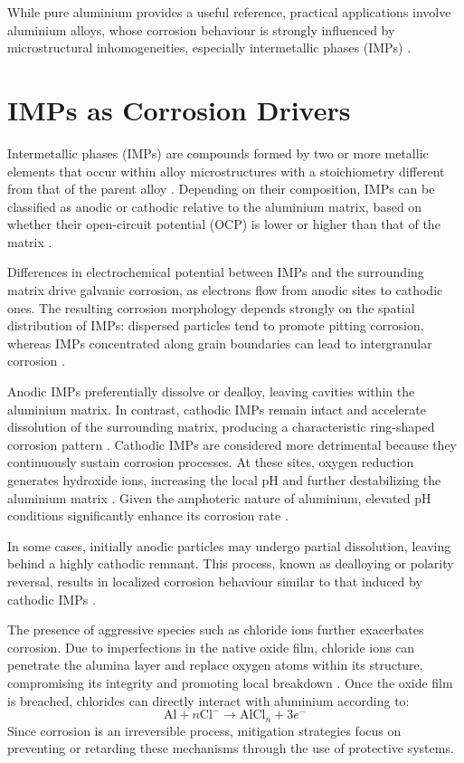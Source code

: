 \documentclass[11pt,twoside,a4paper]{report}
\begin{document}
While pure aluminium provides a useful reference, practical applications involve aluminium alloys, whose corrosion behaviour is strongly influenced by microstructural inhomogeneities, especially intermetallic phases (IMPs) \cite{Vargel2020,Ikeuba2024,Marcus2011,Sastri2007}. 

\section{IMPs as Corrosion Drivers}

Intermetallic phases (IMPs) are compounds formed by two or more metallic elements that occur within alloy microstructures with a stoichiometry different from that of the parent alloy \cite{Vargel2020,Ikeuba2024}. Depending on their composition, IMPs can be classified as anodic or cathodic relative to the aluminium matrix, based on whether their open-circuit potential (OCP) is lower or higher than that of the matrix \cite{Vargel2020,Ikeuba2024,Marcus2011}.

Differences in electrochemical potential between IMPs and the surrounding matrix drive galvanic corrosion, as electrons flow from anodic sites to cathodic ones. The resulting corrosion morphology depends strongly on the spatial distribution of IMPs: dispersed particles tend to promote pitting corrosion, whereas IMPs concentrated along grain boundaries can lead to intergranular corrosion \cite{Vargel2020,Ghali2010,Marcus2011,Sastri2007}.

Anodic IMPs preferentially dissolve or dealloy, leaving cavities within the aluminium matrix. In contrast, cathodic IMPs remain intact and accelerate dissolution of the surrounding matrix, producing a characteristic ring-shaped corrosion pattern \cite{Vargel2020,Ikeuba2024,Marcus2011}. Cathodic IMPs are considered more detrimental because they continuously sustain corrosion processes. At these sites, oxygen reduction generates hydroxide ions, increasing the local pH and further destabilizing the aluminium matrix \cite{Marcus2011,Vargel2020,Ikeuba2024}. Given the amphoteric nature of aluminium, elevated pH conditions significantly enhance its corrosion rate \cite{Vargel2020}.

In some cases, initially anodic particles may undergo partial dissolution, leaving behind a highly cathodic remnant. This process, known as dealloying or polarity reversal, results in localized corrosion behaviour similar to that induced by cathodic IMPs \cite{Vargel2020,Ikeuba2024,Marcus2011}.

The presence of aggressive species such as chloride ions further exacerbates corrosion. Due to imperfections in the native oxide film, chloride ions can penetrate the alumina layer and replace oxygen atoms within its structure, compromising its integrity and promoting local breakdown \cite{Vargel2020,Ikeuba2024}. Once the oxide film is breached, chlorides can directly interact with aluminium according to:
\begin{equation}
\mathrm{Al} + n\mathrm{Cl}^- \rightarrow \mathrm{AlCl}_n + 3e^-
\end{equation}
Since corrosion is an irreversible process, mitigation strategies focus on preventing or retarding these mechanisms through the use of protective systems.
\end{document}

